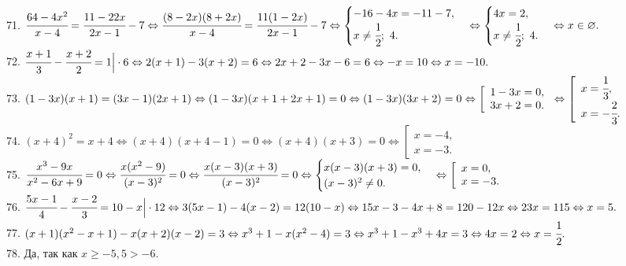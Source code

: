 \documentclass[12pt]{article}
\begin{document}
71. $\cfrac{64-4x^2}{x-4}=\cfrac{11-22x}{2x-1}-7\Leftrightarrow
\cfrac{(8-2x)(8+2x)}{x-4}=\cfrac{11(1-2x)}{2x-1}-7\Leftrightarrow
\begin{cases} -16-4x=-11-7,\\ x\neq\cfrac{1}{2};\ 4.\end{cases}\Leftrightarrow
\begin{cases} 4x=2,\\ x\neq\cfrac{1}{2};\ 4.\end{cases}\Leftrightarrow x\in\varnothing.$\\
72. $\cfrac{x+1}{3}-\cfrac{x+2}{2}=1\Big|\cdot6\Leftrightarrow
2(x+1)-3(x+2)=6\Leftrightarrow2x+2-3x-6=6\Leftrightarrow-x=10\Leftrightarrow x=-10.$\\
73. $(1-3x)(x+1)=(3x-1)(2x+1)\Leftrightarrow (1-3x)(x+1+2x+1)=0\Leftrightarrow(1-3x)(3x+2)=0\Leftrightarrow
\left[\begin{array}{l}1-3x=0,\\ 3x+2=0.\end{array}\right.\Leftrightarrow
\left[\begin{array}{l}x=\cfrac{1}{3},\\ x=-\cfrac{2}{3}.\end{array}\right.$\\
74. $(x+4)^2=x+4\Leftrightarrow (x+4)(x+4-1)=0\Leftrightarrow(x+4)(x+3)=0\Leftrightarrow\left[\begin{array}{l}x=-4,\\ x=-3.\end{array}\right.$\\
75. $\cfrac{x^3-9x}{x^2-6x+9}=0\Leftrightarrow\cfrac{x(x^2-9)}{(x-3)^2}=0\Leftrightarrow\cfrac{x(x-3)(x+3)}{(x-3)^2}=0\Leftrightarrow
\begin{cases} x(x-3)(x+3)=0,\\ (x-3)^2\neq0.\end{cases}\Leftrightarrow \left[\begin{array}{l}x=0,\\ x=-3.\end{array}\right.$\\
76. $\cfrac{5x-1}{4}-\cfrac{x-2}{3}=10-x\Big|\cdot12\Leftrightarrow
3(5x-1)-4(x-2)=12(10-x)\Leftrightarrow15x-3-4x+8=120-12x\Leftrightarrow23x=115\Leftrightarrow x=5.$\\
77. $(x+1)(x^2-x+1)-x(x+2)(x-2)=3\Leftrightarrow x^3+1-x(x^2-4)=3\Leftrightarrow
x^3+1-x^3+4x=3\Leftrightarrow4x=2\Leftrightarrow x=\cfrac{1}{2}.$\\
78. Да, так как $x\geqslant-5,5>-6.$\\
\end{document}
